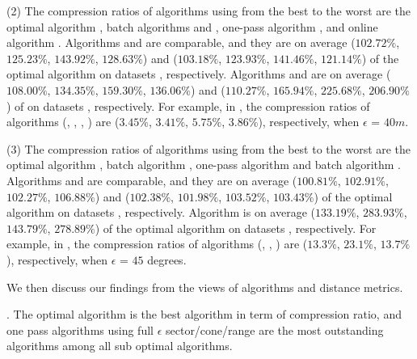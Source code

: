 \sstab(2) The compression ratios of algorithms using \sed from the best
to the worst are the optimal algorithm \opt, batch algorithms \tpa and
\dpa, one-pass algorithm \cised, and online algorithm \squishe.
%
{Algorithms \tpa and \dpa are comparable, and they are on average
($102.72\%$, $125.23\%$, $143.92\%$, $128.63\%$) and ($103.18\%$, $123.93\%$, $141.46\%$, $121.14\%$)
 of the optimal algorithm \opt on datasets \dSets, respectively.}
%
{Algorithms \cised and \squishe are on average ($108.00\%$,
  $134.35\%$, $159.30\%$, $136.06\%$) and ($110.27\%$, $165.94\%$, $225.68\%$, $206.90\%$)
 of \opt on datasets \dSets, respectively.}
%
For example, in \mopsi, the compression ratios of algorithms
(\tpa, \dpa, \squishe, \cised)
are ($3.45\%$, $3.41\%$, $5.75\%$, $3.86\%$), respectively, when $\epsilon$ = $40m$.
%
%
%

\sstab(3) The compression ratios of algorithms using \dad from the best
to the worst are the optimal algorithm \opt, batch algorithm \tpa,
one-pass algorithm \interval and batch algorithm \dpa.
%
{Algorithms \tpa and \interval are comparable, and they are on average
($100.81\%$, $102.91\%$, $102.27\%$, $106.88\%$) and ($102.38\%$, $101.98\%$, $103.52\%$, $103.43\%$)
 of the optimal algorithm \opt on datasets \dSets, respectively.}
%
{Algorithm \dpa is on average ($133.19\%$, $283.93\%$, $143.79\%$, $278.89\%$)
 of the optimal algorithm \opt on datasets \dSets, respectively.}
%
For example, in \mopsi, the compression ratios of algorithms (\tpa, \dpa, \interval)
are ($13.3\%$, $23.1\%$, $13.7\%$), respectively, when $\epsilon$ = $45$ degrees.
%


We then discuss our findings from the views of \lsa algorithms and distance metrics.

. The optimal algorithm is the best algorithm in term of compression ratio, and one pass algorithms using full $\epsilon$ sector/cone/range are the most outstanding algorithms among all sub optimal algorithms.

